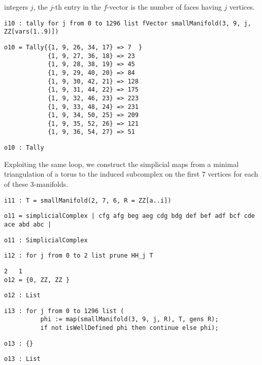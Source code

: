 \documentclass[12pt,leqno]{amsart}
\theoremstyle{definition}
\begin{document}
integers $j$, the $j$-th entry in the $f\!$-vector is the number of faces having
$j$ vertices.
\begin{lstlisting}[xleftmargin=10pt, lineskip=-5pt, aboveskip=3.0pt, belowskip=1.5pt]
i10 : tally for j from 0 to 1296 list fVector smallManifold(3, 9, j, ZZ[vars(1..9)])
\end{lstlisting}
\begin{lstlisting}[xleftmargin=10pt, lineskip=-5pt, aboveskip=4pt, belowskip=1.5pt]
o10 = Tally{{1, 9, 26, 34, 17} => 7  }
            {1, 9, 27, 36, 18} => 23
            {1, 9, 28, 38, 19} => 45
            {1, 9, 29, 40, 20} => 84
            {1, 9, 30, 42, 21} => 128
            {1, 9, 31, 44, 22} => 175
            {1, 9, 32, 46, 23} => 223
            {1, 9, 33, 48, 24} => 231
            {1, 9, 34, 50, 25} => 209
            {1, 9, 35, 52, 26} => 121
            {1, 9, 36, 54, 27} => 51
\end{lstlisting}
\begin{lstlisting}[xleftmargin=10pt, aboveskip=-5pt, belowskip=3.0pt]
o10 : Tally
\end{lstlisting}
Exploiting the same loop, we construct the simplicial maps from a minimal
triangulation of a torus to the induced subcomplex on the first $7$ vertices
for each of these $3$-manifolds.
\begin{lstlisting}[xleftmargin=10pt, aboveskip=3.0pt, belowskip=1.5pt]
i11 : T = smallManifold(2, 7, 6, R = ZZ[a..i])
\end{lstlisting}
\begin{lstlisting}[xleftmargin=10pt, aboveskip=1.5pt, belowskip=1.5pt]
o11 = simplicialComplex | cfg afg beg aeg cdg bdg def bef adf bcf cde ace abd abc |
\end{lstlisting}
\begin{lstlisting}[xleftmargin=10pt, aboveskip=1.5pt, belowskip=1.5pt]
o11 : SimplicialComplex
\end{lstlisting}
\begin{lstlisting}[xleftmargin=10pt, aboveskip=1.5pt, belowskip=1.5pt]
i12 : for j from 0 to 2 list prune HH_j T
\end{lstlisting}
\begin{lstlisting}[xleftmargin=10pt, lineskip=-10pt, aboveskip=4pt, belowskip=1.5pt]
            2   1
o12 = {0, ZZ, ZZ }
\end{lstlisting}
\begin{lstlisting}[xleftmargin=10pt, aboveskip=1.5pt, belowskip=1.5pt]
o12 : List
\end{lstlisting}
\begin{lstlisting}[xleftmargin=10pt, lineskip=-10pt, aboveskip=4pt, belowskip=1.5pt]
i13 : for j from 0 to 1296 list (
          phi := map(smallManifold(3, 9, j, R), T, gens R);
          if not isWellDefined phi then continue else phi);
\end{lstlisting}
\begin{lstlisting}[xleftmargin=10pt, aboveskip=1.5pt, belowskip=1.5pt]
o13 : {}
\end{lstlisting}
\begin{lstlisting}[xleftmargin=10pt, aboveskip=1.5pt, belowskip=1.5pt]
o13 : List
\end{lstlisting}
\end{document}
